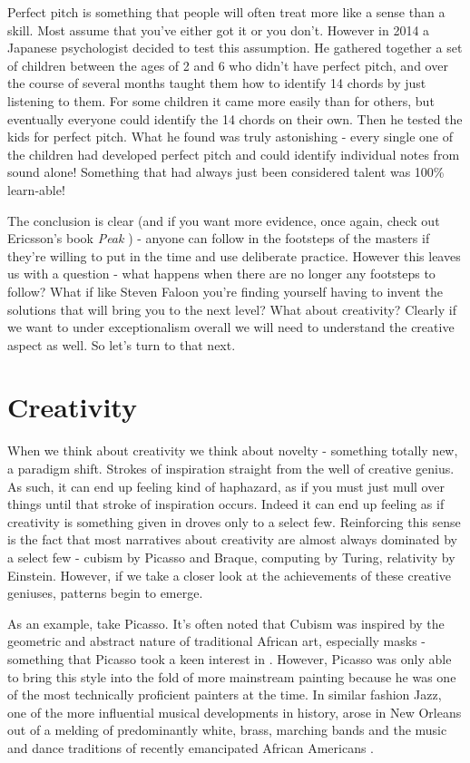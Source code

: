 \documentclass[11pt,a5paper]{book}
\begin{document}
Perfect pitch is something that people will often treat more like a sense than a skill. Most assume that you've either got it or you don't. However in 2014 a Japanese psychologist decided to test this assumption. He gathered together a set of children between the ages of 2 and 6 who didn't have perfect pitch, and over the course of several months taught them how to identify 14 chords by just listening to them. For some children it came more easily than for others, but eventually everyone could identify the 14 chords on their own. Then he tested the kids for perfect pitch. What he found was truly astonishing - every single one of the children had developed perfect pitch and could identify individual notes from sound alone! Something that had always just been considered talent was 100\% learn-able!
\newline

The conclusion is clear (and if you want more evidence, once again, check out Ericsson's book \textit{Peak} \cite{ericsson}) - anyone can follow in the footsteps of the masters if they're willing to put in the time and use deliberate practice. However this leaves us with a question - what happens when there are no longer any footsteps to follow? What if like Steven Faloon you're finding yourself having to invent the solutions that will bring you to the next level? What about creativity? Clearly if we want to under exceptionalism overall we will need to understand the creative aspect as well. So let's turn to that next. 

\section{Creativity}
When we think about creativity we think about novelty - something totally new, a paradigm shift. Strokes of inspiration straight from the well of creative genius. As such, it can end up feeling kind of haphazard, as if you must just mull over things until that stroke of inspiration occurs. Indeed it can end up feeling as if creativity is something given in droves only to a select few. Reinforcing this sense is the fact that most narratives about creativity are almost always dominated by a select few - cubism by Picasso and Braque, computing by Turing, relativity by Einstein. However, if we take a closer look at the achievements of these creative geniuses, patterns begin to emerge. 
\newline

As an example, take Picasso. It's often noted that Cubism was inspired by the geometric and abstract nature of traditional African art, especially masks - something that Picasso took a keen interest in \cite{sabine}. However, Picasso was only able to bring this style into the fold of more mainstream painting because he was one of the most technically proficient painters at the time. In similar fashion Jazz, one of the more influential musical developments in history, arose in New Orleans out of a melding of predominantly white, brass, marching bands and the music and dance traditions of recently emancipated African Americans \cite{jazz}.
\newline
\end{document}
